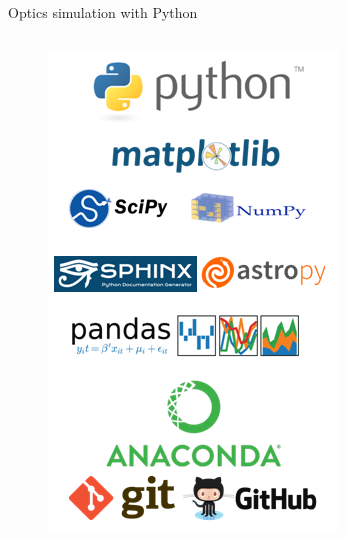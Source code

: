 \documentclass[9pt]{beamer}
\begin{document}
\begin{frame}{Optics simulation with Python}
\begin{columns}[c]
	\begin{column}{0.4\textwidth}
		\begin{figure}
			\includegraphics[width=.8\linewidth]{images/python}
		\end{figure}
	\end{column}
\end{columns}

\end{frame}
\end{document}
